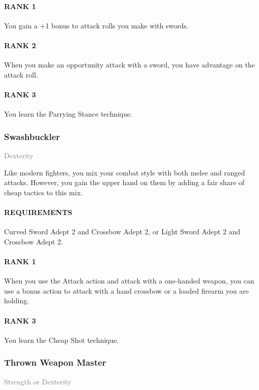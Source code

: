 \paragraph{RANK 1} You gain a +1 bonus to attack rolls you make with swords.
\paragraph{RANK 2} When you make an opportunity attack with a sword, you have advantage on the attack roll.
\paragraph{RANK 3} You learn the Parrying Stance technique.

\subsubsection{Swashbuckler} \label{feat::swashbuckler}
\small{\textcolor{gray}{Dexterity}}

\normalsize
Like modern fighters, you mix your combat style with both melee and ranged attacks.
However, you gain the upper hand on them by adding a fair share of cheap tactics to this mix.
\paragraph{REQUIREMENTS} Curved Sword Adept 2 and Crossbow Adept 2, or Light Sword Adept 2 and Crossbow Adept 2.
\paragraph{RANK 1} When you use the Attack action and attack with a one-handed weapon, you can use a bonus action to attack with a hand crossbow or a loaded firearm you are holding.
\paragraph{RANK 3} You learn the Cheap Shot technique.

\subsubsection{Thrown Weapon Master} \label{feat::thrownweaponmaster}
\small{\textcolor{gray}{Strength or Dexterity}}


